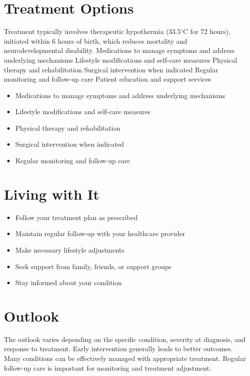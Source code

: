 \section{Treatment Options}
Treatment typically involves therapeutic hypothermia (33.5$^\circ$C for 72 hours), initiated within 6 hours of birth, which reduces mortality and neurodevelopmental disability. Medications to manage symptoms and address underlying mechanisms Lifestyle modifications and self-care measures Physical therapy and rehabilitation Surgical intervention when indicated Regular monitoring and follow-up care Patient education and support services

\begin{itemize}[noitemsep]
  \item Medications to manage symptoms and address underlying mechanisms
  \item Lifestyle modifications and self-care measures
  \item Physical therapy and rehabilitation
  \item Surgical intervention when indicated
  \item Regular monitoring and follow-up care
\end{itemize}
\section{Living with It}
\begin{itemize}[noitemsep]
  \item Follow your treatment plan as prescribed
  \item Maintain regular follow-up with your healthcare provider
  \item Make necessary lifestyle adjustments
  \item Seek support from family, friends, or support groups
  \item Stay informed about your condition
\end{itemize}
\section{Outlook}
The outlook varies depending on the specific condition, severity at diagnosis, and response to treatment. Early intervention generally leads to better outcomes. Many conditions can be effectively managed with appropriate treatment. Regular follow-up care is important for monitoring and treatment adjustment.
